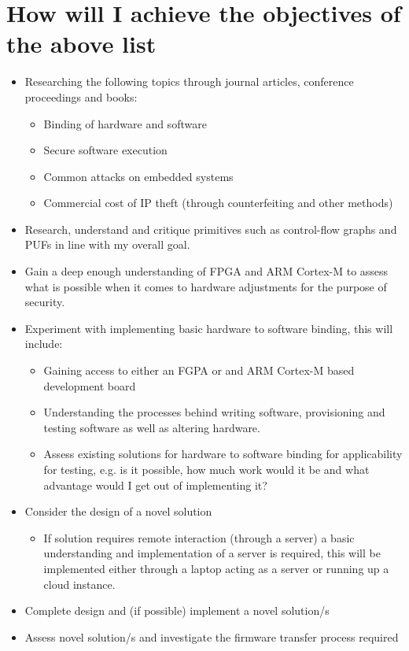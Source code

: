 \documentclass[10pt]{report}
\begin{document}
\section*{How will I achieve the objectives of the above list}
\begin{itemize}
	\item Researching the following topics through journal articles, conference proceedings and books:
	\begin{itemize}
		\item Binding of hardware and software
		\item Secure software execution
		\item Common attacks on embedded systems
		\item Commercial cost of IP theft (through counterfeiting and other methods)
	\end{itemize}
	\item Research, understand and critique primitives such as control-flow graphs and PUFs in line with my overall goal.
	\item Gain a deep enough understanding of FPGA and ARM Cortex-M to assess what is possible when it comes to hardware adjustments for the purpose of security.
	\item Experiment with implementing basic hardware to software binding, this will include:
	\begin{itemize}
		\item Gaining access to either an FGPA or and ARM Cortex-M based development board
		\item Understanding the processes behind writing software, provisioning and testing software as well as altering hardware.
		\item Assess existing solutions for hardware to software binding for applicability for testing, e.g. is it possible, how much work would it be and what advantage would I get out of implementing it?		
	\end{itemize}
	\item Consider the design of a novel solution
	\begin{itemize}
		\item If solution requires remote interaction (through a server) a basic understanding and implementation of a server is required, this will be implemented either through a laptop acting as a server or running up a cloud instance.
	\end{itemize}
	\item Complete design and (if possible) implement a novel solution/s
	\item Assess novel solution/s and investigate the firmware transfer process required	
\end{itemize}
\end{document}
